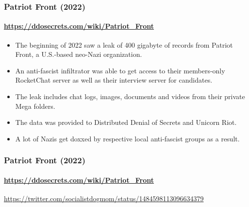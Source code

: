 \documentclass[aspectratio=169,usenames,dvipsnames]{beamer}
\begin{document}
\begin{frame}
  \frametitle{Patriot Front (2022)}
  \framesubtitle{\url{https://ddosecrets.com/wiki/Patriot_Front}}

  \begin{itemize}[<+->]
    \item The beginning of 2022 saw a leak of 400 gigabyte of records from
      Patriot Front, a U.S.-based neo-Nazi organization.
    \item An anti-fascist infiltrator was able to get access to their
      members-only RocketChat server as well as their interview server for
      candidates.
    \item The leak includes chat logs, images, documents and videos from their
      private Mega folders.
    \item The data was provided to Distributed Denial of Secrets and Unicorn
      Riot.
    \item A lot of Nazis get doxxed by respective local anti-fascist groups
      as a result.
  \end{itemize}

\end{frame}

\begin{frame}
  \frametitle{Patriot Front (2022)}
  \framesubtitle{\url{https://ddosecrets.com/wiki/Patriot_Front}}

  \centering

  \footnotesize
  \url{https://twitter.com/socialistdogmom/status/1484598113096634379}
\end{frame}
\end{document}
